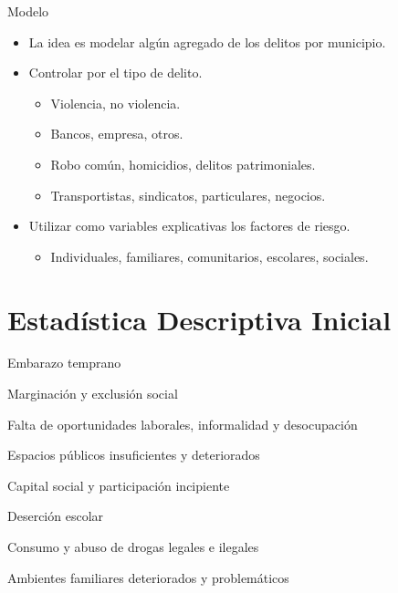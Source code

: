 \documentclass[ignorenonframetext,]{beamer}
\begin{document}
\begin{frame}{Modelo}

\begin{itemize}
\itemsep1pt\parskip0pt
\item
  La idea es modelar algún agregado de los delitos por municipio.
\item
  Controlar por el tipo de delito.

  \begin{itemize}
  \itemsep1pt\parskip0pt
  \item
    Violencia, no violencia.
  \item
    Bancos, empresa, otros.
  \item
    Robo común, homicidios, delitos patrimoniales.
  \item
    Transportistas, sindicatos, particulares, negocios.
  \end{itemize}
\item
  Utilizar como variables explicativas los factores de riesgo.

  \begin{itemize}
  \itemsep1pt\parskip0pt
  \item
    Individuales, familiares, comunitarios, escolares, sociales.
  \end{itemize}
\end{itemize}

\end{frame}

\section{Estadística Descriptiva
Inicial}\label{estadistica-descriptiva-inicial}

\begin{frame}{Embarazo temprano}

\end{frame}

\begin{frame}{Marginación y exclusión social}

\end{frame}

\begin{frame}{Falta de oportunidades laborales, informalidad y
desocupación}

\end{frame}

\begin{frame}{Espacios públicos insuficientes y deteriorados}

\end{frame}

\begin{frame}{Capital social y participación incipiente}

\end{frame}

\begin{frame}{Deserción escolar}

\end{frame}

\begin{frame}{Consumo y abuso de drogas legales e ilegales}

\end{frame}

\begin{frame}{Ambientes familiares deteriorados y problemáticos}

\end{frame}
\end{document}
